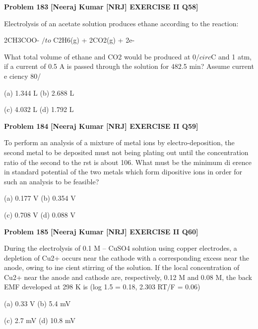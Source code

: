 \begin{problembox}
\textbf{Problem 183} \hfill \textbf{[Neeraj Kumar [NRJ] EXERCISE II Q58]}
\label{q:ext-nrj_all_questions-183}

Electrolysis of an acetate solution produces ethane 
according to the reaction:
 
  2CH3COO- $/to$ C2H6(g) + 2CO2(g) + 2e-
 
 What total volume of ethane and CO2 would be 
produced at 0$/circ$C and 1 atm, if a current of 0.5 
A is passed through the solution for 482.5 min? 
Assume current e   ciency 80/%
 
 (a) 1.344 L 
(b) 2.688 L
 
 (c) 4.032 L 
(d) 1.792 L
\end{problembox}

\begin{problembox}
\textbf{Problem 184} \hfill \textbf{[Neeraj Kumar [NRJ] EXERCISE II Q59]}
\label{q:ext-nrj_all_questions-184}

To perform an analysis of a mixture of metal ions by 
electro-deposition, the second metal to be deposited 
must not being plating out until the concentration 
ratio of the second to the   rst is about 106. What 
must be the minimum di  erence in standard 
potential of the two metals which form dipositive 
ions in order for such an analysis to be feasible?
 
 (a) 0.177 V 
(b) 0.354 V
 
 (c) 0.708 V 
(d) 0.088 V
\end{problembox}

\begin{problembox}
\textbf{Problem 185} \hfill \textbf{[Neeraj Kumar [NRJ] EXERCISE II Q60]}
\label{q:ext-nrj_all_questions-185}

During the electrolysis of 0.1 M -- CuSO4 solution 
using copper electrodes, a depletion of Cu2+ 
occurs near the cathode with a corresponding 
excess near the anode, owing to ine   cient stirring 
of the solution. If the local concentration of Cu2+ 
near the anode and cathode are, respectively, 0.12 
M and 0.08 M, the back EMF developed at 298 K 
is (log 1.5 = 0.18, 2.303 RT/F = 0.06)
 
 (a) 0.33 V 
(b) 5.4 mV
 
 (c) 2.7 mV 
(d) 10.8 mV
\end{problembox}


